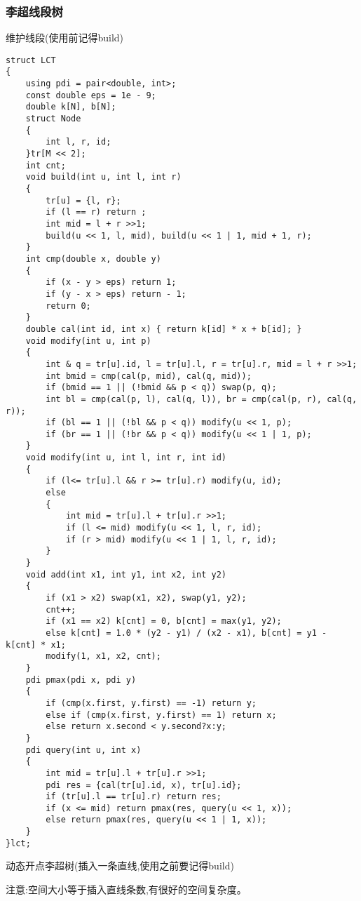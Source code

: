 \documentclass[a4paper, fontset=none]{ctexart}
\begin{document}
\subsubsection{李超线段树}
维护线段(使用前记得build)
\begin{verbatim}
struct LCT
{
    using pdi = pair<double, int>;
    const double eps = 1e - 9;
    double k[N], b[N];
    struct Node
    {
        int l, r, id;
    }tr[M << 2];
    int cnt;
    void build(int u, int l, int r)
    {
        tr[u] = {l, r};
        if (l == r) return ;
        int mid = l + r >>1;
        build(u << 1, l, mid), build(u << 1 | 1, mid + 1, r);
    }
    int cmp(double x, double y)
    {
        if (x - y > eps) return 1;
        if (y - x > eps) return - 1;
        return 0;
    }
    double cal(int id, int x) { return k[id] * x + b[id]; }
    void modify(int u, int p)
    {
        int & q = tr[u].id, l = tr[u].l, r = tr[u].r, mid = l + r >>1;
        int bmid = cmp(cal(p, mid), cal(q, mid));
        if (bmid == 1 || (!bmid && p < q)) swap(p, q);
        int bl = cmp(cal(p, l), cal(q, l)), br = cmp(cal(p, r), cal(q, r));
        if (bl == 1 || (!bl && p < q)) modify(u << 1, p);
        if (br == 1 || (!br && p < q)) modify(u << 1 | 1, p);
    }
    void modify(int u, int l, int r, int id)
    {
        if (l<= tr[u].l && r >= tr[u].r) modify(u, id);
        else
        {
            int mid = tr[u].l + tr[u].r >>1;
            if (l <= mid) modify(u << 1, l, r, id);
            if (r > mid) modify(u << 1 | 1, l, r, id);
        }
    }
    void add(int x1, int y1, int x2, int y2)
    {
        if (x1 > x2) swap(x1, x2), swap(y1, y2);
        cnt++;
        if (x1 == x2) k[cnt] = 0, b[cnt] = max(y1, y2);
        else k[cnt] = 1.0 * (y2 - y1) / (x2 - x1), b[cnt] = y1 - k[cnt] * x1;
        modify(1, x1, x2, cnt);
    }
    pdi pmax(pdi x, pdi y)
    {
        if (cmp(x.first, y.first) == -1) return y;
        else if (cmp(x.first, y.first) == 1) return x;
        else return x.second < y.second?x:y;
    }
    pdi query(int u, int x)
    {
        int mid = tr[u].l + tr[u].r >>1;
        pdi res = {cal(tr[u].id, x), tr[u].id};
        if (tr[u].l == tr[u].r) return res;
        if (x <= mid) return pmax(res, query(u << 1, x));
        else return pmax(res, query(u << 1 | 1, x));
    }
}lct;
\end{verbatim}

动态开点李超树(插入一条直线,使用之前要记得build)

注意:空间大小等于插入直线条数,有很好的空间复杂度。
\end{document}
